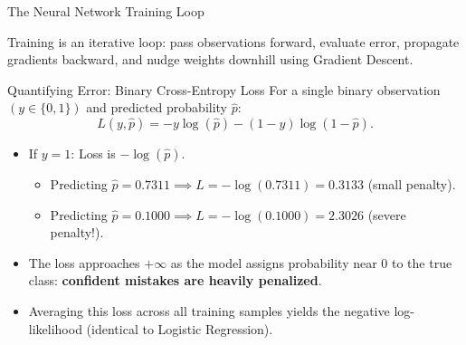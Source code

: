 \begin{frame}{The Neural Network Training Loop}
    \begin{center}
    \end{center}
    \vspace{-0.3em}
    \small
    Training is an iterative loop: pass observations forward, evaluate error, propagate gradients backward, and nudge weights downhill using Gradient Descent.
\end{frame}

\begin{frame}{Quantifying Error: Binary Cross-Entropy Loss}
    For a single binary observation $(y \in \{0, 1\})$ and predicted probability $\hat{p}$:
    \[
        L(y, \hat{p}) = -y\log(\hat{p}) - (1-y)\log(1-\hat{p}).
    \]
    \begin{itemize}
        \item If $y = 1$: Loss is $-\log(\hat{p})$.
        \begin{itemize}
            \item Predicting $\hat{p} = 0.7311 \implies L = -\log(0.7311) = \mathbf{0.3133}$ (small penalty).
            \item Predicting $\hat{p} = 0.1000 \implies L = -\log(0.1000) = \mathbf{2.3026}$ (severe penalty!).
        \end{itemize}
        \item The loss approaches $+\infty$ as the model assigns probability near $0$ to the true class: \textbf{confident mistakes are heavily penalized}.
        \item Averaging this loss across all training samples yields the negative log-likelihood (identical to Logistic Regression).
    \end{itemize}
\end{frame}

